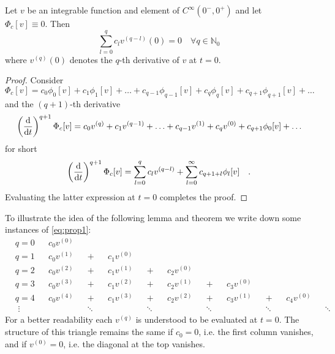 \begin{proposition}{}{}
	Let $v$ be an integrable function and element of $C^\infty(0^-,0^+)$ and let \\
	$\Phi_c[v]\equiv 0$. Then
	\begin{equation}
	\sum\limits_{l=0}^q c_l v^{(q-l)}(0)=0 \quad \forall q \in \mathbb{N}_0 \tag{$\star$}
	\label{eq:prop1}
	\end{equation}
	where $v^{(q)}(0)$ denotes the $q$-th derivative of $v$ at $t=0$.
\end{proposition}
\begin{proof}
	Consider
	\begin{equation}
	\Phi_c[v] = c_0 \phi_0[v] + c_1 \phi_1[v] + \ldots + c_{q-1}\phi_{q-1}[v] + 
	c_q \phi_q[v] + c_{q+1} \phi_{q+1}[v] + \ldots 
	\end{equation}
	and the $(q+1)$-th derivative
	\begin{equation}
	\left( \frac{\text{d}}{\text{d} t} \right)^{q+1}\Phi_c[v] = c_0 v^{(q)} + c_1 v^{(q-1)} + 
	\ldots 	+ c_{q-1} v^{(1)} + c_q v^{(0)} + c_{q+1} \phi_0[v] + \ldots
	\end{equation}
	for short
	\begin{equation}
	\left( \frac{\text{d}}{\text{d} t} \right)^{q+1}\Phi_c[v] = \sum\limits_{l=0}^q c_l v^{(q-l)} 
	+\sum\limits_{l=0}^\infty c_{q+1+l} \phi_{l}[v] \quad . 
	\end{equation}
	Evaluating the latter expression at $t=0$ completes the proof.
\end{proof}

To illustrate the idea of the following lemma and theorem we write down some 
instances of \eqref{eq:prop1}: 
\begin{align*}
&q = 0& &c_0 v^{(0)} \\
&q = 1& &c_0 v^{(1)} &&+&&c_1 v^{(0)} \\
&q = 2& &c_0 v^{(2)} &&+&&c_1 v^{(1)} &&+&&c_2 v^{(0)} \\
&q = 3& &c_0 v^{(3)} &&+&&c_1 v^{(2)} &&+&&c_2 v^{(1)} && +&&c_3 v^{(0)}\\
&q = 4& &c_0 v^{(4)} &&+&&c_1 v^{(3)} &&+&&c_2 v^{(2)} && +&&c_3 v^{(1)} &&+&& c_4 
v^{(0)} \\ 
&\,\, \vdots && && \ddots && &&\ddots && &&\ddots && &&\ddots && &&\ddots 
\end{align*}
For a better readability each $v^{(q)}$ is understood to be evaluated at $t=0$. The 
structure of this triangle remains the same if $c_0=0$, i.e. the first column vanishes, 
and if $v^{(0)}=0$, i.e. the diagonal at the top vanishes. 

